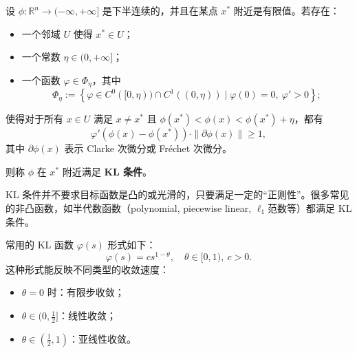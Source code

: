 \begin{definition}[KL 函数]
设 $\phi:\mathbb{R}^n\rightarrow(-\infty,+\infty]$ 是下半连续的，并且在某点 $x^*$ 附近是有限值。若存在：
\begin{itemize}
  \item 一个邻域 $U$ 使得 $x^*\in U$；
  \item 一个常数 $\eta \in (0,+\infty]$；
  \item 一个函数 $\varphi \in \Phi_\eta$，其中
  \[
  \Phi_\eta := \left\{ \varphi\in C^0([0,\eta)) \cap C^1((0,\eta)) \mid \varphi(0)=0,\ \varphi'>0 \right\};
  \]
\end{itemize}
使得对于所有 $x \in U$ 满足 $x \neq x^*$ 且 $\phi(x^*) < \phi(x) < \phi(x^*)+\eta$，都有
\[
\varphi'(\phi(x) - \phi(x^*)) \cdot \|\partial \phi(x)\| \geq 1,
\]
其中 $\partial \phi(x)$ 表示 Clarke 次微分或 Fréchet 次微分。

则称 $\phi$ 在 $x^*$ 附近满足 \textbf{KL 条件}。
\end{definition}

\begin{remark}
KL 条件并不要求目标函数是凸的或光滑的，只要满足一定的“正则性”。很多常见的非凸函数，如半代数函数（polynomial, piecewise linear, $\ell_1$范数等）都满足 KL 条件。
\end{remark}



\begin{example}[KL 函数的形式]
常用的 KL 函数 $\varphi(s)$ 形式如下：
\[
\varphi(s) = c s^{1-\theta},\quad \theta \in [0,1),\ c>0.
\]
这种形式能反映不同类型的收敛速度：
\begin{itemize}
  \item $\theta = 0$ 时：有限步收敛；
  \item $\theta \in (0, \frac{1}{2}]$：线性收敛；
  \item $\theta \in (\frac{1}{2}, 1)$：亚线性收敛。
\end{itemize}
\end{example}

